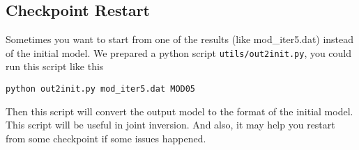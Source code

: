 \documentclass[UTF8]{article}
\begin{document}
\subsection{Checkpoint Restart}
Sometimes you want to start from one of the results (like mod\_iter5.dat)
instead of the initial model. We prepared a python script
\texttt{utils/out2init.py}, you could run this script like this 
\begin{lstlisting}
python out2init.py mod_iter5.dat MOD05 
\end{lstlisting}
Then this script will convert the output model to the format 
of the initial model. This script will be useful in joint inversion.
And also, it may help you restart from some checkpoint if some issues 
happened.



\end{document}

